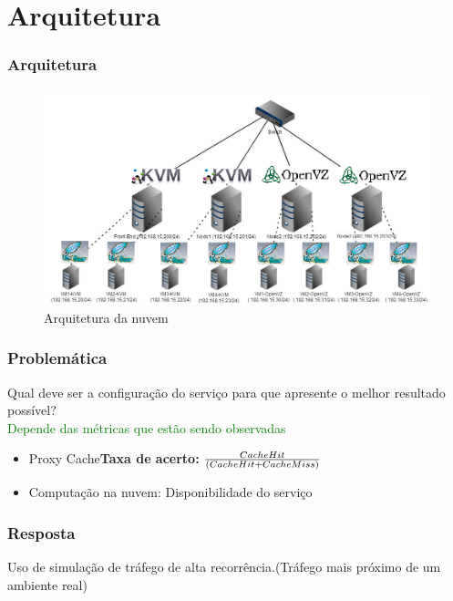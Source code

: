 \documentclass{beamer}
\begin{document}
    \section{Arquitetura}
    \begin{frame}
     \frametitle{Arquitetura}
     \begin{figure}
      \centering
      \includegraphics[scale=0.4]{imagens/arquiteturanuvem.png}
      \caption{Arquitetura da nuvem}
     \end{figure}
    \end{frame}

    \begin{frame}
     \frametitle{Problemática}     
     Qual deve ser a configuração do serviço para que apresente o melhor resultado possível?\\
     \textcolor{green}{Depende das métricas que estão sendo observadas}
    \begin{itemize}
     \item Proxy Cache\textbf{Taxa de acerto:} ${Cache Hit\over(Cache Hit + Cache Miss)}$
     \item Computação na nuvem: Disponibilidade do serviço
    \end{itemize}
    \end{frame}

    \begin{frame}
      \frametitle{Resposta}
      \huge{Uso de simulação de tráfego de alta recorrência.(Tráfego mais próximo de um ambiente real)}
    \end{frame}
\end{document}
